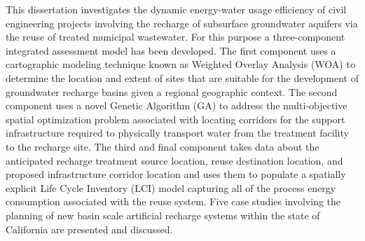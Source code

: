 
This dissertation investigates the dynamic energy-water usage efficiency of civil engineering projects involving the recharge of subsurface groundwater aquifers via the reuse of treated municipal wastewater. For this purpose a three-component integrated assessment model has been developed. The first component uses a cartographic modeling technique known as Weighted Overlay Analysis (WOA) to determine the location and extent of sites that are suitable for the development of groundwater recharge basins given a regional geographic context. The second component uses a novel Genetic Algorithm (GA) to address the multi-objective spatial optimization problem associated with locating corridors for the support infrastructure required to physically transport water from the treatment facility to the recharge site. The third and final component takes data about the anticipated recharge treatment source location, reuse destination location, and proposed infrastructure corridor location and uses them to populate a spatially explicit Life Cycle Inventory (LCI) model capturing all of the process energy consumption associated with the reuse system. Five case studies involving the planning of new basin scale artificial recharge systems within the state of California are presented and discussed.